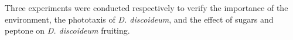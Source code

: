 Three experiments were conducted respectively to verify the importance of the environment, the phototaxis of \textsl{D. discoideum}, and the effect of sugars and peptone on \textsl{D. discoideum} fruiting. 